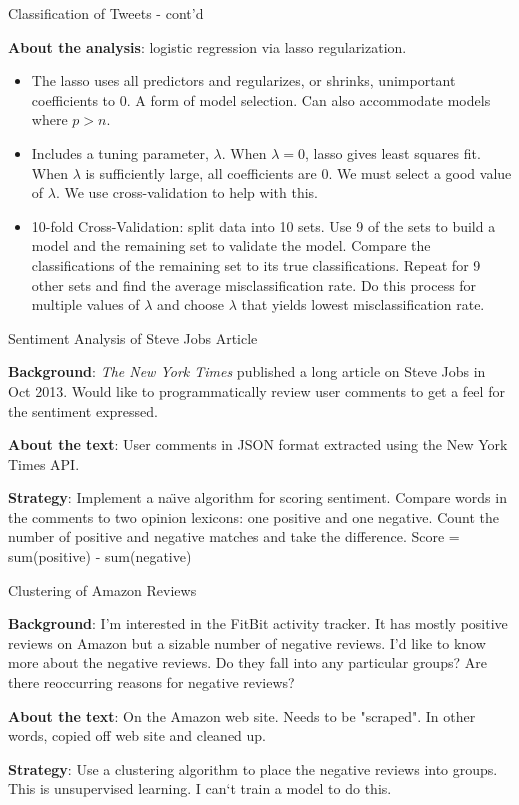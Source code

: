 \documentclass[xcolor=dvipsnames]{beamer}
\newcommand{\bi}{\begin{itemize}}
\newcommand{\ei}{\end{itemize}}
\newcommand{\+}{\item}
\begin{document}
\begin{frame}{Classification of Tweets - cont'd}

{\bf About the analysis}: logistic regression via lasso regularization.
\pause 

\bi
	\+ The lasso uses all predictors and regularizes, or shrinks, unimportant coefficients to 0. A form of model selection. Can also accommodate models where $p > n$. 
	\+ Includes a tuning parameter, $ \lambda $. When $ \lambda  = 0$, lasso gives least squares fit. When $ \lambda $ is sufficiently large, all coefficients are 0. We must select a good value of $ \lambda $. We use cross-validation to help with this. 
	\+ 10-fold Cross-Validation: split data into 10 sets. Use 9 of the sets to build a model and the remaining set to validate the model. Compare the classifications of the remaining set to its true classifications. Repeat for 9 other sets and find the average misclassification rate. Do this process for multiple values of $ \lambda $ and choose $ \lambda $ that yields lowest misclassification rate. 
\ei
\end{frame}

\begin{frame}{Sentiment Analysis of Steve Jobs Article}

{\bf Background}: {\it The New York Times} published a long article on Steve Jobs in Oct 2013. Would like to programmatically review user comments to get a feel for the sentiment expressed. 

\pause 

{\bf About the text}: User comments in JSON format extracted using the New York Times API. 

\pause 


{\bf Strategy}: Implement a na\"{\i}ve algorithm for scoring sentiment. Compare words in the comments to two opinion lexicons: one positive and one negative. Count the number of positive and negative matches and take the difference. Score = sum(positive) - sum(negative)



\end{frame}

\begin{frame}{Clustering of Amazon Reviews}

{\bf Background}: I'm interested in the FitBit activity tracker. It has mostly positive reviews on Amazon but a sizable number of negative reviews. I'd like to know more about the negative reviews. Do they fall into any particular groups? Are there reoccurring reasons for negative reviews?

\pause 

{\bf About the text}: On the Amazon web site. Needs to be "scraped". In other words, copied off web site and cleaned up.

\pause 

{\bf Strategy}: Use a clustering algorithm to place the negative reviews into groups. This is unsupervised learning. I can`t train a model to do this. 


\end{frame}
\end{document}
